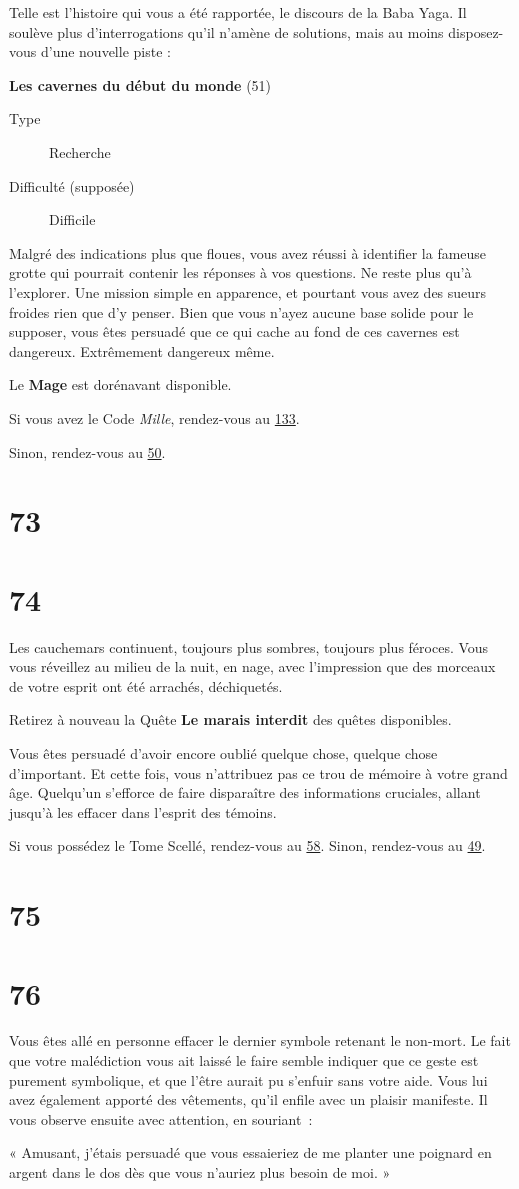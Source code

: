 \documentclass{report}
\newcommand{\gsection}[1]{
    \section{#1}
    \label{section-#1}
}
\newcommand{\glink}[1]{\hyperref[section-#1]{#1}}
\newcommand{\quest}[5]{
    \begin{mdframed}[innertopmargin=0.5cm,innerbottommargin=0.5cm]
        \begin{center}
            \textbf{#1} (#2)
        \end{center}
        \begin{description}
            \item[Type] #3
            \item[Difficulté (supposée)] #4
        \end{description}
        #5
    \end{mdframed}
}
\newcommand{\hero}[1]{
    \textbf{#1}
}
\begin{document}
Telle est l'histoire qui vous a été rapportée, le discours de la Baba Yaga. Il soulève plus d'interrogations qu'il n'amène de solutions, mais au moins disposez-vous d'une nouvelle piste :

\quest{Les cavernes du début du monde}{51}{Recherche}{Difficile}{
Malgré des indications plus que floues, vous avez réussi à identifier la fameuse grotte qui pourrait contenir les réponses à vos questions. Ne reste plus qu'à l'explorer. Une mission simple en apparence, et pourtant vous avez des sueurs froides rien que d'y penser. Bien que vous n'ayez aucune base solide pour le supposer, vous êtes persuadé que ce qui cache au fond de ces cavernes est dangereux. Extrêmement dangereux même.
}

Le \hero{Mage} est dorénavant disponible.

Si vous avez le Code \emph{Mille}, rendez-vous au \glink{133}.

Sinon, rendez-vous au \glink{50}.

\gsection{73}

\gsection{74}

Les cauchemars continuent, toujours plus sombres, toujours plus féroces. Vous vous réveillez au milieu de la nuit, en nage, avec l'impression que des morceaux de votre esprit ont été arrachés, déchiquetés.

Retirez à nouveau la Quête \textbf{Le marais interdit} des quêtes disponibles.

Vous êtes persuadé d'avoir encore oublié quelque chose, quelque chose d'important. Et cette fois, vous n'attribuez pas ce trou de mémoire à votre grand âge. Quelqu'un s'efforce de faire disparaître des informations cruciales, allant jusqu'à les effacer dans l'esprit des témoins.

Si vous possédez le Tome Scellé, rendez-vous au \glink{58}. Sinon, rendez-vous au \glink{49}.

\gsection{75}


\gsection{76}

Vous êtes allé en personne effacer le dernier symbole retenant le non-mort. Le fait que votre malédiction vous ait laissé le faire semble indiquer que ce geste est purement symbolique, et que l'être aurait pu s'enfuir sans votre aide. Vous lui avez également apporté des vêtements, qu'il enfile avec un plaisir manifeste. Il vous observe ensuite avec attention, en souriant :

« Amusant, j'étais persuadé que vous essaieriez de me planter une poignard en argent dans le dos dès que vous n'auriez plus besoin de moi. »
\end{document}
